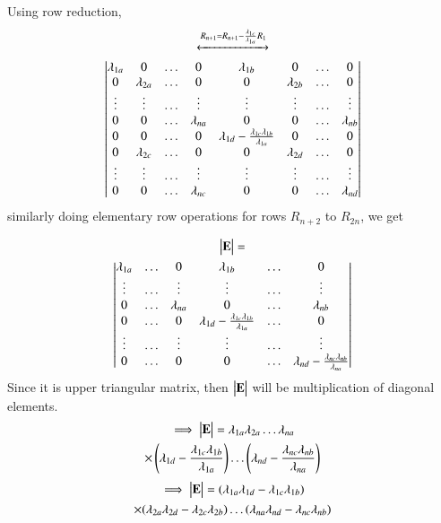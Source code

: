 Using row reduction,
\begin{multline}
    \xleftrightarrow[]{R_{n+1}=R_{n+1}-\frac{\lambda_{1c}}{\lambda_{1a}}R_1}\\
    \begin{vmatrix}\lambda_{1a}&0&\dots&0&\lambda_{1b}&0&\dots&0\\0&\lambda_{2a}&\dots&0&0&\lambda_{2b}&\dots&0\\\vdots&\vdots&\dots&\vdots&\vdots&\vdots&\dots&\vdots\\0&0&\dots&\lambda_{na}&0&0&\dots&\lambda_{nb}\\0&0&\dots&0&\lambda_{1d}-\frac{\lambda_{1c}\lambda_{1b}}{\lambda_{1a}}&0&\dots&0\\0&\lambda_{2c}&\dots&0&0&\lambda_{2d}&\dots&0\\\vdots&\vdots&\dots&\vdots&\vdots&\vdots&\dots&\vdots\\0&0&\dots&\lambda_{nc}&0&0&\dots&\lambda_{nd}\end{vmatrix}
\end{multline}
similarly doing elementary row operations for rows $R_{n+2}$ to $R_{2n}$, we get

\begin{multline}
    \begin{vmatrix}\mathbf{E}\end{vmatrix}=\\\begin{vmatrix}\lambda_{1a}&\dots&0&\lambda_{1b}&\dots&0\\\vdots&\dots&\vdots&\vdots&\dots&\vdots\\0&\dots&\lambda_{na}&0&\dots&\lambda_{nb}\\0&\dots&0&\lambda_{1d}-\frac{\lambda_{1c}\lambda_{1b}}{\lambda_{1a}}&\dots&0\\\vdots&\dots&\vdots&\vdots&\dots&\vdots\\0&\dots&0&0&\dots&\lambda_{nd}-\frac{\lambda_{nc}\lambda_{nb}}{\lambda_{na}}\end{vmatrix}
\end{multline}
Since it is upper triangular matrix, then $\begin{vmatrix}\mathbf{E}\end{vmatrix}$ will be multiplication of diagonal elements.
\begin{multline}
    \implies\begin{vmatrix}\mathbf{E}\end{vmatrix}=\lambda_{1a}\lambda_{2a}\dots\lambda_{na}\\\times\left(\lambda_{1d}-\frac{\lambda_{1c}\lambda_{1b}}{\lambda_{1a}}\right)\dots\left(\lambda_{nd}-\frac{\lambda_{nc}\lambda_{nb}}{\lambda_{na}}\right)
\end{multline}
\begin{multline}
    \implies\begin{vmatrix}\mathbf{E}\end{vmatrix}=(\lambda_{1a}\lambda_{1d}-\lambda_{1c}\lambda_{1b})\\\times(\lambda_{2a}\lambda_{2d}-\lambda_{2c}\lambda_{2b})\dots(\lambda_{na}\lambda_{nd}-\lambda_{nc}\lambda_{nb})\label{eq:solutions/6/5/4/detE}
\end{multline}

